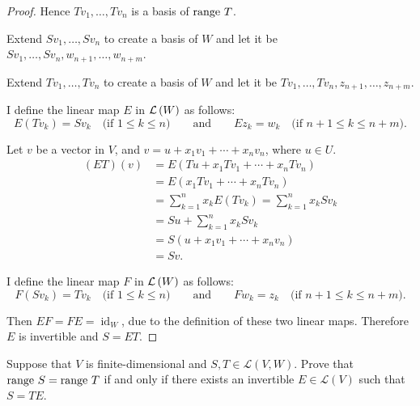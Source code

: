 \begin{proof}
    Hence $Tv_{1}, \ldots, Tv_{n}$ is a basis of $\operatorname{range}\,{T}$.

    Extend $Sv_{1}, \ldots, Sv_{n}$ to create a basis of $W$ and let it be $Sv_{1}, \ldots, Sv_{n}, w_{n+1}, \ldots, w_{n+m}$.

    Extend $Tv_{1}, \ldots, Tv_{n}$ to create a basis of $W$ and let it be $Tv_{1}, \ldots, Tv_{n}, z_{n+1}, \ldots, z_{n+m}$.

    I define the linear map $E$ in $\mathcal{L}\left({W}\right)$ as follows:
    \[
        E(Tv_{k}) = Sv_{k}\quad \text{(if $1\leq k\leq n$)} \qquad\text{and}\qquad Ez_{k} = w_{k} \quad\text{(if $n+1\leq k\leq n+m$)}.
    \]

    Let $v$ be a vector in $V$, and $v = u + x_{1}v_{1} + \cdots + x_{n}v_{n}$, where $u\in U$.
    \begin{align*}
        (ET)(v) & = E(Tu + x_{1}Tv_{1} + \cdots + x_{n}Tv_{n})               \\
                & = E(x_{1}Tv_{1} + \cdots + x_{n}Tv_{n})                    \\
                & = \sum^{n}_{k=1}x_{k}E(Tv_{k}) = \sum^{n}_{k=1}x_{k}Sv_{k} \\
                & = Su + \sum^{n}_{k=1}x_{k}Sv_{k}                           \\
                & = S(u + x_{1}v_{1} + \cdots + x_{n}v_{n})                  \\
                & = Sv.
    \end{align*}

    I define the linear map $F$ in $\mathcal{L}\left({W}\right)$ as follows:
    \[
        F(Sv_{k}) = Tv_{k}\quad \text{(if $1\leq k\leq n$)} \qquad\text{and}\qquad Fw_{k} = z_{k} \quad\text{(if $n+1\leq k\leq n+m$)}.
    \]

    Then $EF = FE = \operatorname{id}_{W}$, due to the definition of these two linear maps. Therefore $E$ is invertible and $S = ET$.
\end{proof}
\newpage

\begin{exercise}
    Suppose that $V$ is finite-dimensional and $S, T \in \mathcal{L}(V, W)$. Prove that $\operatorname{range}\,{S} = \operatorname{range}\,{T}$ if and only if there exists an invertible $E \in \mathcal{L}(V)$ such that $S = TE$.
\end{exercise}

